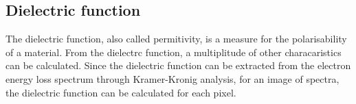 \subsection{Dielectric function}

The dielectric function, also called permitivity, is a measure for the polarisability of a material. From the dielectrc function, a multiplitude of other characaristics can be calculated. Since the dielectric function can be extracted from the electron energy loss spectrum through Kramer-Kronig analysis, for an image of spectra, the dielectric function can be calculated for each pixel. 